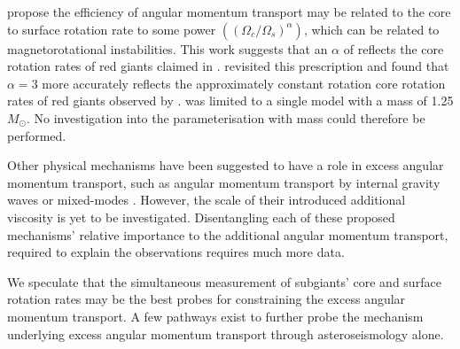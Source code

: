 \citet{spada_angular_2016} propose the efficiency of angular momentum transport may be related to the core to surface rotation rate to some power $\left(\left(\Omega_c/\Omega_s\right)^{\alpha}\right)$, which can be related to magnetorotational instabilities.
This work suggests that an $\alpha$ of reflects the core rotation rates of red giants claimed in \citet{mosser_spin_2012}.
\citet{moyano_asteroseismology_2022} revisited this prescription and found that $\alpha = 3$ more accurately reflects the approximately constant rotation core rotation rates of red giants observed by \citet{gehan_core_2018}.
\citet{spada_angular_2016} was limited to a single model with a mass of 1.25 $M_{\odot}$.
No investigation into the parameterisation with mass could therefore be performed.

Other physical mechanisms have been suggested to have a role in excess angular momentum transport, such as angular momentum transport by internal gravity waves \citep{pincon_can_2017} or mixed-modes \citep{belkacem_angular_2015}. 
However, the scale of their introduced additional viscosity is yet to be investigated.
Disentangling each of these proposed mechanisms' relative importance to the additional angular momentum transport, required to explain the observations requires much more data.



We speculate that the simultaneous measurement of subgiants' core and surface rotation rates may be the best probes for constraining the excess angular momentum transport.
A few pathways exist to further probe the mechanism underlying excess angular momentum transport through asteroseismology alone.

